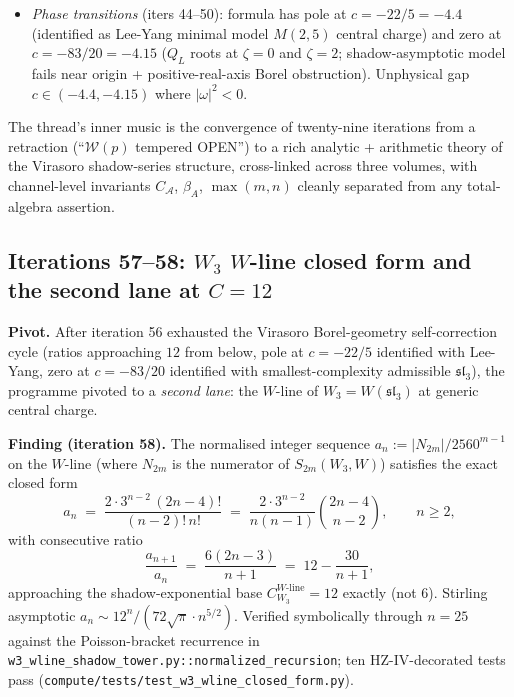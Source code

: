 \documentclass[11pt]{article}
\newcommand{\cA}{\mathcal{A}}
\newcommand{\cW}{\mathcal{W}}
\begin{document}
\begin{itemize}
        $\to \pi/3 = 2\pi/6$ at $c \to \infty$
        (Virasoro-specific coincidence); minimal polynomial
        $\omega^2 - 2\omega + 4 = 0$; cyclotomic field
        $\mathbb{Q}(\zeta_6) = \mathbb{Q}(\sqrt{-3})$.
  \item \emph{Phase transitions} (iters 44--50): formula has
        pole at $c = -22/5 = -4.4$ (identified as Lee-Yang
        minimal model $M(2, 5)$ central charge) and zero at
        $c = -83/20 = -4.15$ ($Q_L$ roots at $\zeta = 0$ and
        $\zeta = 2$; shadow-asymptotic model fails near origin
        + positive-real-axis Borel obstruction). Unphysical gap
        $c \in (-4.4, -4.15)$ where $|\omega|^2 < 0$.
\end{itemize}

The thread's inner music is the convergence of twenty-nine
iterations from a retraction (``$\cW(p)$ tempered OPEN'') to a rich
analytic + arithmetic theory of the Virasoro shadow-series
structure, cross-linked across three volumes, with channel-level
invariants $C_\cA$, $\beta_A$, $\max(m, n)$ cleanly separated from
any total-algebra assertion.

\subsection{Iterations 57--58: $W_3$ $W$-line closed form and the
second lane at $C = 12$}
\label{subsec:loop-iter-57-58-w3-wline}

\textbf{Pivot.} After iteration 56 exhausted the Virasoro Borel-geometry
self-correction cycle (ratios approaching $12$ from below, pole at
$c = -22/5$ identified with Lee-Yang, zero at $c = -83/20$ identified
with smallest-complexity admissible $\mathfrak{sl}_3$), the programme
pivoted to a \emph{second lane}: the $W$-line of $W_3 = W(\mathfrak{sl}_3)$
at generic central charge.

\textbf{Finding (iteration 58).} The normalised integer sequence
$a_n := |N_{2m}|/2560^{m-1}$ on the $W$-line (where $N_{2m}$ is the
numerator of $S_{2m}(W_3, W)$) satisfies the exact closed form
\[
  a_n \;=\; \frac{2 \cdot 3^{n-2} \, (2n-4)!}{(n-2)! \, n!}
       \;=\; \frac{2 \cdot 3^{n-2}}{n(n-1)}
             \binom{2n-4}{n-2},
  \qquad n \ge 2,
\]
with consecutive ratio
\[
  \frac{a_{n+1}}{a_n} \;=\; \frac{6 (2n-3)}{n+1}
                 \;=\; 12 - \frac{30}{n+1},
\]
approaching the shadow-exponential base $C_{W_3}^{W\text{-line}} = 12$
exactly (not $6$). Stirling asymptotic
$a_n \sim 12^n / (72 \sqrt{\pi} \cdot n^{5/2})$. Verified
symbolically through $n = 25$ against the Poisson-bracket
recurrence in \texttt{w3\_wline\_shadow\_tower.py::normalized\_recursion};
ten HZ-IV-decorated tests pass
(\texttt{compute/tests/test\_w3\_wline\_closed\_form.py}).
\end{document}
